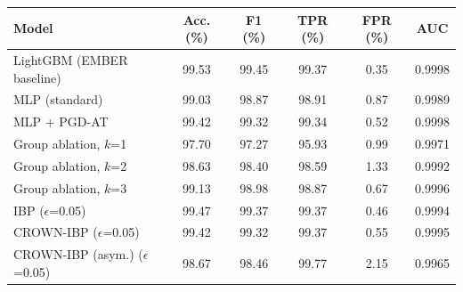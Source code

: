 \begin{tabular}{lccccc}
\toprule
Model & Acc. (\%) & F1 (\%) & TPR (\%) & FPR (\%) & AUC \\
\midrule
LightGBM (EMBER baseline) & 99.53 & 99.45 & 99.37 & 0.35 & 0.9998 \\
MLP (standard) & 99.03 & 98.87 & 98.91 & 0.87 & 0.9989 \\
MLP + PGD-AT & 99.42 & 99.32 & 99.34 & 0.52 & 0.9998 \\
Group ablation, $k$=1 & 97.70 & 97.27 & 95.93 & 0.99 & 0.9971 \\
Group ablation, $k$=2 & 98.63 & 98.40 & 98.59 & 1.33 & 0.9992 \\
Group ablation, $k$=3 & 99.13 & 98.98 & 98.87 & 0.67 & 0.9996 \\
IBP ($\epsilon$=0.05) & 99.47 & 99.37 & 99.37 & 0.46 & 0.9994 \\
CROWN-IBP ($\epsilon$=0.05) & 99.42 & 99.32 & 99.37 & 0.55 & 0.9995 \\
CROWN-IBP (asym.) ($\epsilon$=0.05) & 98.67 & 98.46 & 99.77 & 2.15 & 0.9965 \\
\bottomrule
\end{tabular}